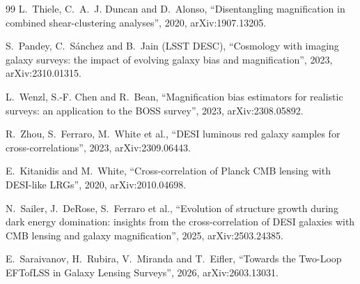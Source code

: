 \documentclass[11pt]{article}
\begin{document}
\begin{thebibliography}{99}
L.~Thiele, C.~A.~J. Duncan and D.~Alonso,
``Disentangling magnification in combined shear-clustering
analyses'',
2020, arXiv:1907.13205.

S.~Pandey, C.~S\'anchez and B.~Jain (LSST DESC),
``Cosmology with imaging galaxy surveys: the impact of evolving
galaxy bias and magnification'',
2023, arXiv:2310.01315.

L.~Wenzl, S.-F. Chen and R.~Bean,
``Magnification bias estimators for realistic surveys: an application
to the BOSS survey'',
2023, arXiv:2308.05892.

R.~Zhou, S.~Ferraro, M.~White et al.,
``DESI luminous red galaxy samples for cross-correlations'',
2023, arXiv:2309.06443.

E.~Kitanidis and M.~White,
``Cross-correlation of Planck CMB lensing with DESI-like LRGs'',
2020, arXiv:2010.04698.

N.~Sailer, J.~DeRose, S.~Ferraro et al.,
``Evolution of structure growth during dark energy domination:
insights from the cross-correlation of DESI galaxies with CMB
lensing and galaxy magnification'',
2025, arXiv:2503.24385.

E.~Saraivanov, H.~Rubira, V.~Miranda and T.~Eifler,
``Towards the Two-Loop EFTofLSS in Galaxy Lensing Surveys'',
2026, arXiv:2603.13031.

\end{thebibliography}
\end{document}
